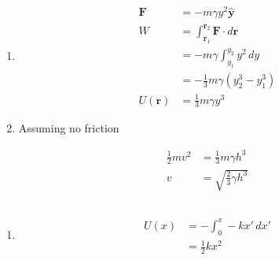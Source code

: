 \documentclass{article}
\renewcommand{\vec}[1]{\boldsymbol{\mathbf{#1}}}
\newcommand{\uvec}[1]{\hat{\vec{#1}}}
\begin{document}
\setcounter{subsection}{6}
\subsection{}

\begin{enumerate}
  \item

        \begin{align*}
          \vec{F}    & = -m \gamma y^2 \uvec{y}                               \\
          W          & = \int_{\vec{r}_1}^{\vec{r}_2} \vec{F} \cdot d \vec{r} \\
                     & = -m \gamma \int_{y_1}^{y_2} y^2 \,d y                 \\
                     & = -\frac{1}{3} m \gamma (y_2^3 - y_1^3)                \\
          U(\vec{r}) & = \frac{1}{3} m \gamma y^3
        \end{align*}

  \item Assuming no friction

        \begin{align*}
          \frac{1}{2} m v^2 & = \frac{1}{3} m \gamma h^3      \\
          v                 & = \sqrt{\frac{2}{3} \gamma h^3}
        \end{align*}
\end{enumerate}

\setcounter{subsection}{8}
\subsection{}

\begin{enumerate}
  \item

        \begin{align*}
          U(x) & = -\int_0^x -k x' \,d x' \\
               & = \frac{1}{2} k x^2
        \end{align*}
\end{enumerate}

\setcounter{subsection}{10}
\subsection{}
\end{document}
